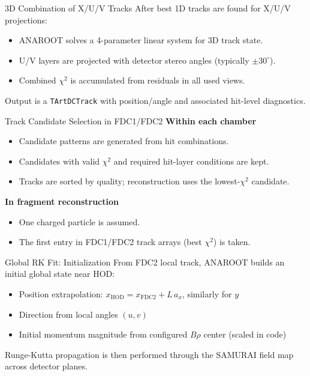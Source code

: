 \documentclass[aspectratio=169]{beamer}
\begin{document}
\begin{frame}{3D Combination of X/U/V Tracks}
After best 1D tracks are found for X/U/V projections:
\begin{itemize}
\item ANAROOT solves a 4-parameter linear system for 3D track state.
\item U/V layers are projected with detector stereo angles (typically \(\pm30^\circ\)).
\item Combined \(\chi^2\) is accumulated from residuals in all used views.
\end{itemize}

\vspace{0.2cm}
Output is a \texttt{TArtDCTrack} with position/angle and associated hit-level diagnostics.
\end{frame}

\begin{frame}{Track Candidate Selection in FDC1/FDC2}
\textbf{Within each chamber}
\begin{itemize}
\item Candidate patterns are generated from hit combinations.
\item Candidates with valid \(\chi^2\) and required hit-layer conditions are kept.
\item Tracks are sorted by quality; reconstruction uses the lowest-\(\chi^2\) candidate.
\end{itemize}

\vspace{0.2cm}
\textbf{In fragment reconstruction}
\begin{itemize}
\item One charged particle is assumed.
\item The first entry in FDC1/FDC2 track arrays (best \(\chi^2\)) is taken.
\end{itemize}
\end{frame}

\begin{frame}{Global RK Fit: Initialization}
From FDC2 local track, ANAROOT builds an initial global state near HOD:
\begin{itemize}
\item Position extrapolation: \(x_{\mathrm{HOD}} = x_{\mathrm{FDC2}} + L\,a_x\), similarly for \(y\)
\item Direction from local angles \((u,v)\)
\item Initial momentum magnitude from configured \(B\rho\) center (scaled in code)
\end{itemize}

\vspace{0.2cm}
Runge-Kutta propagation is then performed through the SAMURAI field map across detector planes.
\end{frame}
\end{document}
